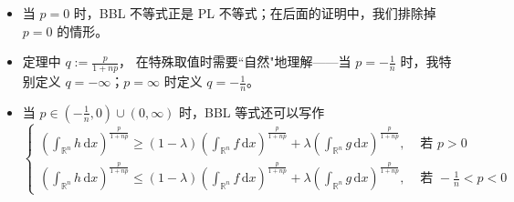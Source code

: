 \begin{remark}
\begin{itemize}
\item 当 $p=0$ 时，BBL 不等式正是 PL 不等式；在后面的证明中，我们排除掉 $p=0$ 的情形。
\item 定理中 $q:=\frac{p}{1+np}$， 在特殊取值时需要``自然"地理解——当 $p=-\frac1n$ 时，我特别定义 $q=-\infty$；$p=\infty$ 时定义 $q=-\frac1n$。
\item 当 $p\in\left(-\frac{1}{n},0\right)\cup(0,\infty)$ 时，BBL 等式还可以写作
\[
\begin{cases}
\displaystyle\left(\int_{\mathbb{R}^n}h\,\mathrm{d}x\right)^{\frac{p}{1+np}}\ge(1-\lambda)\left(\int_{\mathbb{R}^n}f\,\mathrm{d}x\right)^{\frac{p}{1+np}}+\lambda \left(\int_{\mathbb{R}^n}g\,\mathrm{d}x\right)^{\frac{p}{1+np}},&\text{ 若 }p>0\\
\displaystyle\left(\int_{\mathbb{R}^n}h\,\mathrm{d}x\right)^{\frac{p}{1+np}}\le(1-\lambda)\left(\int_{\mathbb{R}^n}f\,\mathrm{d}x\right)^{\frac{p}{1+np}}+\lambda \left(\int_{\mathbb{R}^n}g\,\mathrm{d}x\right)^{\frac{p}{1+np}},&\text{ 若 }-\frac1n< p<0
\end{cases}
\]
\end{itemize}
\end{remark}

